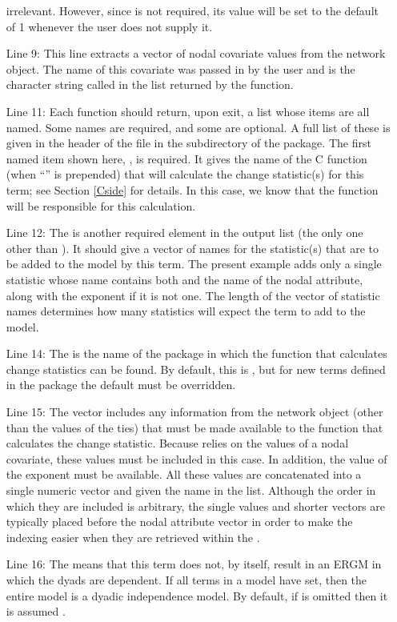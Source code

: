\documentclass[nojss]{jss}
\begin{document}
\begin{itemize}
irrelevant.  However, since  is not required, its value will be set to the
default of 1 whenever the user does not supply it.
\item[Line 9:] This line extracts a vector of nodal covariate
values from the network object.  The name of this covariate was passed in by the
user and is the character string called  in the list returned by the
 function.
\item[Line 11:]  Each  function should return, upon exit,
a list whose items are all named.  Some names are required, and some
are optional.  A full list of these is given in the header of the 
file in the  subdirectory of the  package.
The first named item shown here, , is required.  It gives the name
of the C function (when ``'' is prepended) that will calculate the
change statistic(s) for this term; see Section \ref{Cside} for details.  In this case,
we know that the function  will be responsible for this calculation.
\item [Line 12:]  The  is another required element in the output
list (the only one other than ).  It should give a vector of names
for the statistic(s) that are to be added to the model by this term.  The present
example adds only a single statistic whose name contains
both  and the name of the nodal attribute, along with the exponent
 if it is not one.  The length of the vector of statistic names determines how
many statistics  will expect the term to add to the model.
\item [Line 14:]
The  is the name of the  package in which the
 function that calculates change statistics can be found.  By default,
this is , but for new terms defined in the  package
the default must be overridden.
\item [Line 15:]
The  vector includes any information from the network object (other than the values of the ties) that must be made available to the  function that calculates the change statistic.  Because  relies on the values of a nodal covariate, these values must be included in this case. In addition, the value of the
 exponent must be available.  All these values
are concatenated into a single numeric vector and given the name  in the
list. Although the order in which they are included is arbitrary, the single values and shorter vectors are typically placed before the nodal attribute vector in order to make the indexing easier when they are retrieved within the .
\item[Line 16:]  The  means that this term does not, by itself,
result in an ERGM in which the dyads are dependent.   If all terms in a model
have  set, then the entire model is a dyadic independence
model.  By default, if  is omitted then it is assumed .
\end{itemize}
\end{document}
